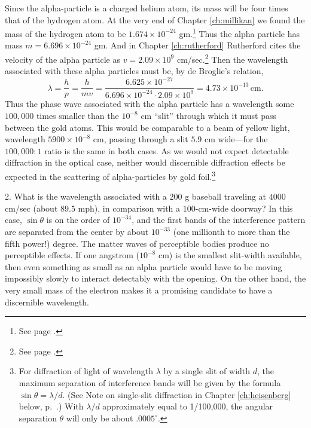Since the alpha-particle is a charged helium atom, its mass will be four
times that of the hydrogen atom. At the very end of Chapter \ref{ch:millikan}
we found the mass of the hydrogen atom to be 
$1.674\times 10^{-24}$ gm.\footnote{See page \pageref{s:millikan_hyd}.}
Thus the alpha particle has mass $m = 6.696\times 10^{-24}$ gm. And in 
Chapter \ref{ch:rutherford} Rutherford cites the
velocity of the alpha particle as $v = 2.09\times 10^{9}$ cm/sec.\footnote{See
page \pageref{s:rutherford_alpha}.} Then 
the wavelength associated with these
alpha particles must be, by de Broglie's relation,
\begin{equation*}
\lambda = \frac{h}{p} = \frac{h}{mv} = 
\frac{6.625\times 10^{-27}}{6.696\times 10^{-24}\cdot2.09\times 10^9}
= 4.73\times 10^{-13}\, \text{cm}.
\end{equation*}
Thus the phase wave associated with the alpha particle has a wavelength
some $100,000$ times smaller than the $10^{-8}$ cm ``slit''
through which it must pass between the gold atoms. This would be
comparable to a beam of yellow light, wavelength $5900\!\times\!10^{-8}$ cm, passing
through a slit $5.9$ cm wide---for the $100,000:1$ ratio is the same in both
cases. As we would not expect detectable diffraction in the optical
case, neither would discernible diffraction effects be expected in the
scattering of alpha-particles by gold foil.\footnote{For diffraction of
  light of wavelength $\lambda$ by a single slit of width $d$, the
  maximum separation of interference bands will be given by the formula
  $\sin{\theta} = \lambda/d$. (See Note on single-slit diffraction in Chapter
  \ref{ch:heisenberg} below, p.~\pageref{eq:diffraction}.) With
  $\lambda/d$ approximately equal to 1/100,000, the angular
  separation $\theta$ will only be about $.0005^{\circ}$.}

2. What is the wavelength associated with a $200$ g baseball traveling at
$4000$ cm/sec (about $89.5$ mph), in comparison with a $100$-cm-wide doorway?
In this case, $\sin{\theta}$ is on the order of $10^{-34}$,
and the first bands of the interference pattern are separated from the
center by about $10^{-33}$ (one millionth to more than the
fifth power!) degree. The matter waves of perceptible bodies produce no
perceptible effects. If one angstrom ($10^{-8}$ cm) is the
smallest slit-width available, then even something as small as an alpha
particle would have to be moving impossibly slowly to interact
detectably with the opening. On the other hand, the very small mass of
the electron makes it a promising candidate to have a discernible
wavelength.

